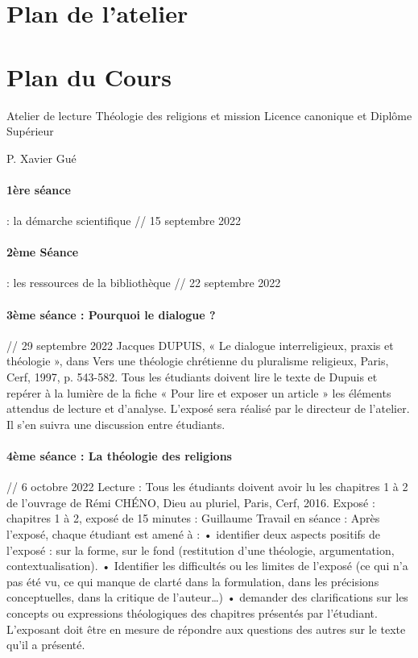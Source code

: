 \section{Plan de l'atelier}


\section{Plan du Cours}


Atelier de lecture
Théologie des religions et mission
Licence canonique et Diplôme Supérieur
 
P. Xavier Gué 
  
\paragraph{1ère séance} : la démarche scientifique // 15 septembre 2022

\paragraph{2ème Séance }: les ressources de la bibliothèque // 22 septembre 2022

\paragraph{3ème séance : Pourquoi le dialogue ?} // 29 septembre 2022 
Jacques DUPUIS, « Le dialogue interreligieux, praxis et théologie », dans Vers une théologie chrétienne du pluralisme religieux, Paris, Cerf, 1997, p. 543-582.
Tous les étudiants doivent lire le texte de Dupuis et repérer à la lumière de la fiche « Pour lire et exposer un article » les éléments attendus de lecture et d’analyse. 
L’exposé sera réalisé par le directeur de l’atelier. 
Il s’en suivra une discussion entre étudiants. 

\paragraph{4ème séance : La théologie des religions} // 6 octobre 2022
Lecture : Tous les étudiants doivent avoir lu les chapitres 1 à 2 de l’ouvrage de Rémi CHÉNO, Dieu au pluriel, Paris, Cerf, 2016. 
Exposé : chapitres 1 à 2,  exposé de 15 minutes : Guillaume
Travail en séance : Après l’exposé, chaque étudiant est amené à : 
•	identifier deux aspects positifs de l’exposé : sur la forme, sur le fond (restitution d’une théologie, argumentation, contextualisation). 
•	Identifier les difficultés ou les limites de l’exposé (ce qui n’a pas été vu, ce qui manque de clarté dans la formulation, dans les précisions conceptuelles, dans la critique de l’auteur…)
•	demander des clarifications sur les concepts ou expressions théologiques des chapitres présentés par l’étudiant. L’exposant doit être en mesure de répondre aux questions des autres sur le texte qu’il a présenté. 
 
